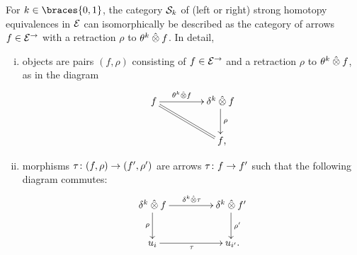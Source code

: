 \documentclass[reqno,10pt,a4paper,oneside]{amsart}
\begin{document}
\begin{lemma} \label{strong-h-equiv-as-section}
For $k \in \braces{0, 1}$, the category $\cal{S}_k$ of (left or right) strong homotopy equivalences in $\catE$ can isomorphically be described as the category of arrows $f \in \catE^{\to}$ with a retraction $\rho$ to $\thetak \hatotimes f$.
In detail,
\begin{enumerate}[(i)]
\item objects are pairs $(f, \rho)$ consisting of $f \in \catE^\to$ and a retraction $\rho$ to $\thetak \hatotimes f$, as in the diagram
\[
\xymatrix@C+2em{
  f
  \ar[r]^-{\thetak \hatotimes f}
  \ar@{=}[dr]
&
  \kcyl \hatotimes f \ar[d]^{\rho}
\\&
  f
\rlap{,}}
\]
\item morphisms $\tau \co (f, \rho) \to (f', \rho')$ are arrows $\tau \co f \to f'$ such that the following diagram commutes:
\[
\xymatrix@C+2em{
  \kcyl \hatotimes f
  \ar[d]_-{\rho}
  \ar[r]^{\kcyl \hatotimes \tau}
&
 \kcyl \hatotimes f'
  \ar[d]^-{\rho'}
\\
  u_i
  \ar[r]_{\tau}
&
  u_{i'} \rlap{.}
}
\]
\end{enumerate}
\end{lemma}
\end{document}
